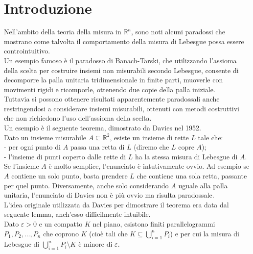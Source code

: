 \documentclass[a4paper, twoside,openright]{article}
\newcommand{\R}{\mathbb{R}}
\newcommand{\e}{\varepsilon}
\newcommand{\<}{\langle}
\renewcommand{\>}{\rangle}
\begin{document}


\tableofcontents
\clearpage

\section{Introduzione}
	
	Nell’ambito della teoria della misura in $\R^n$, sono noti alcuni paradossi che mostrano come talvolta il comportamento della misura di Lebesgue possa essere controintuitivo.\\
	Un esempio famoso è il paradosso di Banach-Tarski, che utilizzando l’assioma della scelta per costruire insiemi non misurabili secondo Lebesgue, consente di decomporre la palla unitaria tridimensionale in finite parti, muoverle con movimenti rigidi e ricomporle, ottenendo due copie della palla iniziale.\\
	Tuttavia si possono ottenere risultati apparentemente paradossali anche restringendosi a considerare insiemi misurabili, ottenuti con metodi costruttivi che non richiedono l’uso dell’assioma della scelta.\\
	Un esempio è il seguente teorema, dimostrato da Davies nel 1952. \\
	Dato un insieme misurabile $A \subseteq \mathbb{R}^{2}$, esiste un insieme di rette $L$ tale che:\\
	- per ogni punto di $A$ passa una retta di $L$ (diremo che $L$ copre $A$);\\
	- l'insieme di punti coperto dalle rette di $L$ ha la stessa misura di Lebesgue di $A$.\\
	
	Se l’insieme $A$ è molto semplice, l’enunciato è intutivamente ovvio. Ad esempio se $A$ contiene un solo punto, basta prendere $L$ che contiene una sola retta, passante per quel punto. Diversamente, anche solo considerando $A$ uguale alla palla unitaria, l’enunciato di Davies non è più ovvio ma risulta paradossale. \\
	L’idea originale utilizzata da Davies per dimostrare il teorema era data dal seguente lemma, anch’esso difficilmente intuibile.\\
	Dato $\e >0$ e un compatto $K$ nel piano, esistono finiti parallelogrammi $P_1, P_2, …,P_n$ che coprono $K$ (cioè tali che $K \subseteq \bigcup_{i=1}^nP_i$) e per cui la misura di Lebesgue di $\bigcup_{i=1}^n P_i \setminus K$ è minore di $\e$. \\
	
\end{document}
